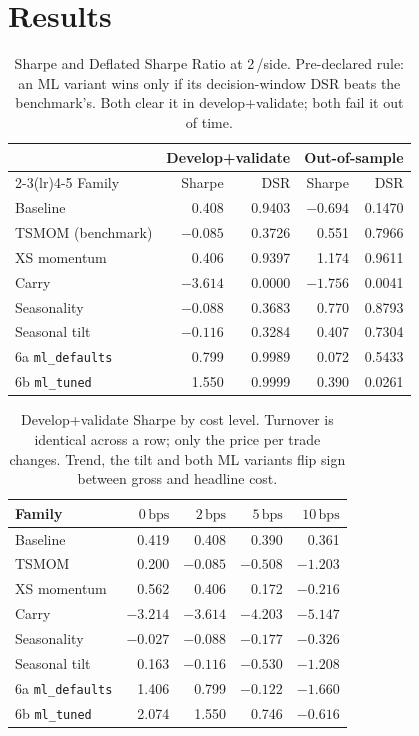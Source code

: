 \documentclass[11pt,a4paper]{article}
\newcommand{\bps}{\,\text{bps}}
\begin{document}
\section{Results}
\begin{table}[h]
\centering
\small
\begin{tabular}{@{}lrrrr@{}}
\toprule
& \multicolumn{2}{c}{Develop+validate} & \multicolumn{2}{c}{Out-of-sample} \\
\cmidrule(lr){2-3}\cmidrule(lr){4-5}
Family & Sharpe & DSR & Sharpe & DSR \\
\midrule
Baseline            & 0.408 & 0.9403 & $-0.694$ & 0.1470 \\
TSMOM (benchmark)   & $-0.085$ & 0.3726 & 0.551 & 0.7966 \\
XS momentum         & 0.406 & 0.9397 & 1.174 & 0.9611 \\
Carry               & $-3.614$ & 0.0000 & $-1.756$ & 0.0041 \\
Seasonality         & $-0.088$ & 0.3683 & 0.770 & 0.8793 \\
Seasonal tilt       & $-0.116$ & 0.3284 & 0.407 & 0.7304 \\
6a \texttt{ml\_defaults} & 0.799 & 0.9989 & 0.072 & 0.5433 \\
6b \texttt{ml\_tuned}    & 1.550 & 0.9999 & 0.390 & 0.0261 \\
\bottomrule
\end{tabular}
\caption{Sharpe and Deflated Sharpe Ratio at 2\bps/side. Pre-declared rule: an ML variant wins only
if its decision-window DSR beats the benchmark's. Both clear it in develop+validate; both fail it out
of time.}
\end{table}

\begin{table}[h]
\centering
\small
\begin{tabular}{@{}lrrrr@{}}
\toprule
Family & $0\bps$ & $2\bps$ & $5\bps$ & $10\bps$ \\
\midrule
Baseline            & 0.419 & 0.408 & 0.390 & 0.361 \\
TSMOM               & 0.200 & $-0.085$ & $-0.508$ & $-1.203$ \\
XS momentum         & 0.562 & 0.406 & 0.172 & $-0.216$ \\
Carry               & $-3.214$ & $-3.614$ & $-4.203$ & $-5.147$ \\
Seasonality         & $-0.027$ & $-0.088$ & $-0.177$ & $-0.326$ \\
Seasonal tilt       & 0.163 & $-0.116$ & $-0.530$ & $-1.208$ \\
6a \texttt{ml\_defaults} & 1.406 & 0.799 & $-0.122$ & $-1.660$ \\
6b \texttt{ml\_tuned}    & 2.074 & 1.550 & 0.746 & $-0.616$ \\
\bottomrule
\end{tabular}
\caption{Develop+validate Sharpe by cost level. Turnover is identical across a row; only the price
per trade changes. Trend, the tilt and both ML variants flip sign between gross and headline cost.}
\end{table}
\end{document}
